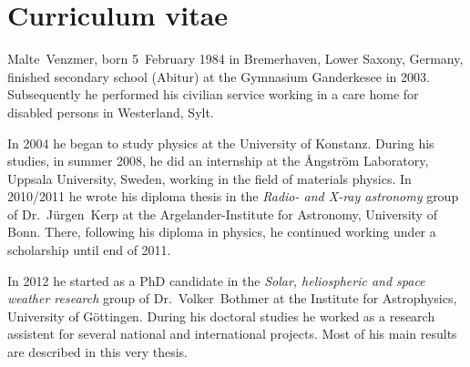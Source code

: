 
\chapter*{Curriculum vitae}


Malte~Venzmer, born 5~February 1984 in Bremerhaven, Lower Saxony, Germany, finished secondary school (Abitur) at the Gymnasium Ganderkesee in 2003. Subsequently he performed his civilian service working in a care home for disabled persons in Westerland, Sylt.

In 2004 he began to study physics at the University of Konstanz. During his studies, in summer 2008, he did an internship at the \AA{}ngström Laboratory, Uppsala University, Sweden, working in the field of materials physics. In 2010/2011 he wrote his diploma thesis in the \textit{Radio- and X-ray astronomy} group of Dr.~Jürgen~Kerp at the Argelander-Institute for Astronomy, University of Bonn. There, following his diploma in physics, he continued working under a scholarship until end of 2011.

In 2012 he started as a PhD candidate in the \textit{Solar, heliospheric and space weather research} group of Dr.~Volker~Bothmer at the Institute for Astrophysics, University of Göttingen. During his doctoral studies he worked as a research assistent for several national and international projects. Most of his main results are described in this very thesis.

